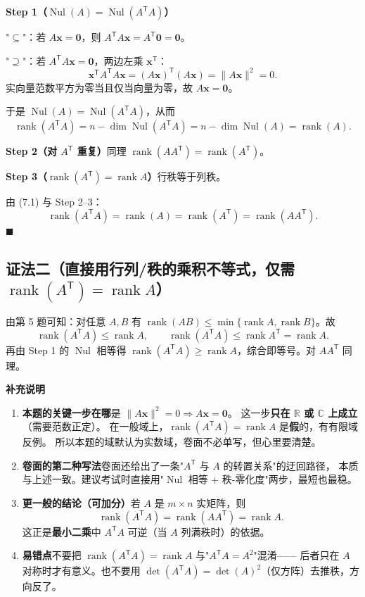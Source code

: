 \documentclass[10pt]{ctexart}
\newcommand{\Rr}{\mathbb{R}}
\newcommand{\CC}{\mathbb{C}}
\newcommand{\rank}{\operatorname{rank}}
\newcommand{\Nul}{\operatorname{Nul}}
\newcommand{\TT}{^{\mathsf T}}
\begin{document}
\textbf{Step 1（$\Nul(A)=\Nul(A\TT A)$）}\quad

"$\subseteq$"：若 $A\mathbf x=\mathbf 0$，则 $A\TT A\mathbf x=A\TT\mathbf 0=\mathbf 0$。

"$\supseteq$"：若 $A\TT A\mathbf x=\mathbf 0$，两边左乘 $\mathbf x\TT$：
\[
\mathbf x\TT A\TT A\mathbf x=(A\mathbf x)\TT(A\mathbf x)=\lVert A\mathbf x\rVert^2=0 .
\]
实向量范数平方为零当且仅当向量为零，故 $A\mathbf x=\mathbf 0$。

于是 $\Nul(A)=\Nul(A\TT A)$，从而
\[
\rank(A\TT A)=n-\dim\Nul(A\TT A)=n-\dim\Nul(A)=\rank(A). \tag{7.1}
\]

\textbf{Step 2（对 $A\TT$ 重复）}\quad 同理 $\rank(AA\TT)=\rank(A\TT)$。

\textbf{Step 3（$\rank(A\TT)=\rank A$）}\quad 行秩等于列秩。

由 (7.1) 与 Step 2--3：
\[
\rank(A\TT A)=\rank(A)=\rank(A\TT)=\rank(AA\TT).
\]
$\blacksquare$

\subsection*{证法二（直接用行列/秩的乘积不等式，仅需 $\rank(A\TT)=\rank A$）}

由第 5 题可知：对任意 $A,B$ 有 $\rank(AB)\le\min\{\rank A,\rank B\}$。故
\[
\rank(A\TT A)\le\rank A,\qquad \rank(A\TT A)\le\rank A\TT=\rank A .
\]
再由 Step 1 的 $\Nul$ 相等得 $\rank(A\TT A)\ge\rank A$，综合即等号。对 $AA\TT$ 同理。

\begin{supbox}
\textbf{补充说明}

\begin{enumerate}
\item \textbf{本题的关键一步在哪}\quad 是 $\lVert A\mathbf x\rVert^2=0\Rightarrow A\mathbf x=\mathbf 0$。
这一步\textbf{只在 $\Rr$ 或 $\CC$ 上成立}（需要范数正定）。
在一般域上，$\rank(A\TT A)=\rank A$ 是\textbf{假}的，有有限域反例。
所以本题的域默认为实数域，卷面不必单写，但心里要清楚。

\item \textbf{卷面的第二种写法}\quad 卷面还给出了一条"$A\TT$ 与 $A$ 的转置关系"的迂回路径，
本质与上述一致。建议考试时直接用"$\Nul$ 相等 + 秩-零化度"两步，最短也最稳。

\item \textbf{更一般的结论（可加分）}\quad 若 $A$ 是 $m\times n$ 实矩阵，则
\[
\rank(A\TT A)=\rank(AA\TT)=\rank A .
\]
这正是\textbf{最小二乘}中 $A\TT A$ 可逆（当 $A$ 列满秩时）的依据。

\item \textbf{易错点}\quad 不要把 $\rank(A\TT A)=\rank A$ 与"$A\TT A=A^2$"混淆——
后者只在 $A$ 对称时才有意义。也不要用 $\det(A\TT A)=\det(A)^2$（仅方阵）去推秩，方向反了。
\end{enumerate}
\end{supbox}
\end{document}

